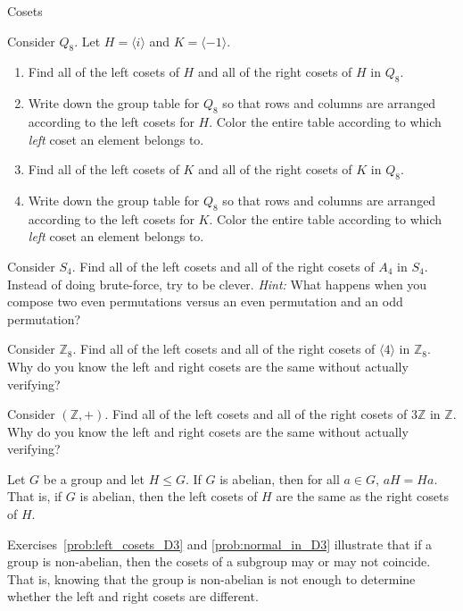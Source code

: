 \begin{section}{Cosets}
\begin{problem}\label{prob:normal_in_Q8}
Consider $Q_8$.  Let $H=\langle i\rangle$ and $K=\langle -1\rangle$.
\begin{enumerate}[label=\rm{(\alph*)}]
\item Find all of the left cosets of $H$ and all of the right cosets of $H$ in $Q_8$.  
\item Write down the group table for $Q_8$ so that rows and columns are arranged according to the left cosets for $H$.  Color the entire table according to which \emph{left} coset an element belongs to.
\item Find all of the left cosets of $K$ and all of the right cosets of $K$ in $Q_8$.
\item Write down the group table for $Q_8$ so that rows and columns are arranged according to the left cosets for $K$.  Color the entire table according to which \emph{left} coset an element belongs to.
\end{enumerate}
\end{problem}

\begin{problem}
Consider $S_4$.  Find all of the left cosets and all of the right cosets of $A_4$ in $S_4$. Instead of doing brute-force, try to be clever. \emph{Hint:} What happens when you compose two even permutations versus an even permutation and an odd permutation?
\end{problem}

\begin{problem}
Consider $\mathbb{Z}_8$.  Find all of the left cosets and all of the right cosets of $\langle 4\rangle$ in $\mathbb{Z}_8$. Why do you know the left and right cosets are the same without actually verifying?
\end{problem}

\begin{problem}
Consider $(\mathbb{Z},+)$.  Find all of the left cosets and all of the right cosets of $3\mathbb{Z}$ in $\mathbb{Z}$. Why do you know the left and right cosets are the same without actually verifying?
\end{problem}

\begin{theorem}
Let $G$ be a group and let $H\leq G$. If $G$ is abelian, then for all $a\in G$, $aH=Ha$.  That is, if $G$ is abelian, then the left cosets of $H$ are the same as the right cosets of $H$.
\end{theorem}

Exercises~\ref{prob:left_cosets_D3} and \ref{prob:normal_in_D3} illustrate that if a group is non-abelian, then the cosets of a subgroup may or may not coincide.  That is, knowing that the group is non-abelian is not enough to determine whether the left and right cosets are different.


\end{section}
